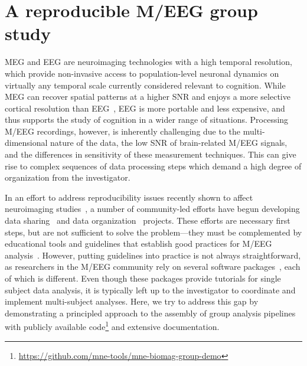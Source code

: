 \clearpage
\section{A reproducible M/EEG group study}
\label{sec:group_study_intro}


\Ac{MEG} and \ac{EEG} are neuroimaging technologies with a high temporal resolution, which provide non-invasive access to population-level neuronal dynamics on virtually any temporal scale currently considered relevant to cognition. %
While MEG can recover spatial patterns at a higher \ac{SNR} and enjoys a more selective cortical resolution than \ac{EEG}~\citep{baillet17}, EEG is more portable and less expensive, and thus supports the study of cognition in a wider range of situations. Processing M/EEG recordings, however, is inherently challenging due to the multi-dimensional nature of the data, the low \ac{SNR} of brain-related M/EEG signals, and the differences in sensitivity of these measurement techniques. This can give rise to complex sequences of data processing steps which demand a high degree of organization from the investigator.

In an effort to address reproducibility issues recently shown to affect neuroimaging studies~\citep{ioannidis2005most, button2013power,Carp2012,Carp2012289}, a number of community-led efforts have begun developing data sharing~\citep{poldrack2017openfmri} and data organization~\citep{gorgolewski2016brain, galan2017meg} projects. These efforts are necessary first steps, but are not sufficient to solve the problem---they must be complemented by educational tools and guidelines that establish good practices for M/EEG analysis~\citep{gross-etal:13}. However, putting guidelines into practice is not always straightforward, as researchers in the M/EEG community rely on several software packages~\citep{tadel2011brainstorm,delorme2004eeglab,eeglab2,
oostenveld2010fieldtrip,nutmeg,litvak2011eeg}, each of which is different. Even though these packages provide tutorials for single subject data analysis, it is typically left up to the investigator to coordinate and implement multi-subject analyses. Here, we try to address this gap by demonstrating a principled approach to the assembly of group analysis pipelines with publicly available code\footnote{\url{https://github.com/mne-tools/mne-biomag-group-demo}} and extensive documentation. 

